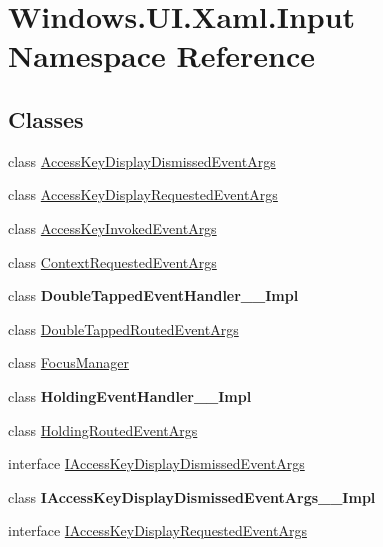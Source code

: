 \hypertarget{namespace_windows_1_1_u_i_1_1_xaml_1_1_input}{}\section{Windows.\+U\+I.\+Xaml.\+Input Namespace Reference}
\label{namespace_windows_1_1_u_i_1_1_xaml_1_1_input}
\subsection*{Classes}
\begin{DoxyCompactItemize}
\item 
class \hyperlink{class_windows_1_1_u_i_1_1_xaml_1_1_input_1_1_access_key_display_dismissed_event_args}{Access\+Key\+Display\+Dismissed\+Event\+Args}
\item 
class \hyperlink{class_windows_1_1_u_i_1_1_xaml_1_1_input_1_1_access_key_display_requested_event_args}{Access\+Key\+Display\+Requested\+Event\+Args}
\item 
class \hyperlink{class_windows_1_1_u_i_1_1_xaml_1_1_input_1_1_access_key_invoked_event_args}{Access\+Key\+Invoked\+Event\+Args}
\item 
class \hyperlink{class_windows_1_1_u_i_1_1_xaml_1_1_input_1_1_context_requested_event_args}{Context\+Requested\+Event\+Args}
\item 
class {\bfseries Double\+Tapped\+Event\+Handler\+\_\+\+\_\+\+Impl}
\item 
class \hyperlink{class_windows_1_1_u_i_1_1_xaml_1_1_input_1_1_double_tapped_routed_event_args}{Double\+Tapped\+Routed\+Event\+Args}
\item 
class \hyperlink{class_windows_1_1_u_i_1_1_xaml_1_1_input_1_1_focus_manager}{Focus\+Manager}
\item 
class {\bfseries Holding\+Event\+Handler\+\_\+\+\_\+\+Impl}
\item 
class \hyperlink{class_windows_1_1_u_i_1_1_xaml_1_1_input_1_1_holding_routed_event_args}{Holding\+Routed\+Event\+Args}
\item 
interface \hyperlink{interface_windows_1_1_u_i_1_1_xaml_1_1_input_1_1_i_access_key_display_dismissed_event_args}{I\+Access\+Key\+Display\+Dismissed\+Event\+Args}
\item 
class {\bfseries I\+Access\+Key\+Display\+Dismissed\+Event\+Args\+\_\+\+\_\+\+Impl}
\item 
interface \hyperlink{interface_windows_1_1_u_i_1_1_xaml_1_1_input_1_1_i_access_key_display_requested_event_args}{I\+Access\+Key\+Display\+Requested\+Event\+Args}

\end{DoxyCompactItemize}

